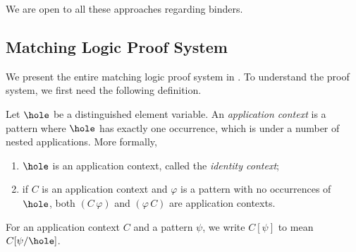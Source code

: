 \documentclass{article}
\begin{document}
We are open to all these approaches regarding binders.

\subsection{Matching Logic Proof System}
\label{sec:ml_proof_system}

We present the entire matching logic proof system in
.
To understand the proof system, we first need the following definition.

\begin{definition}
Let $\hole$ be a distinguished element variable.
An \emph{application context} is a pattern
where $\hole$ has exactly one occurrence, which is under
a number of nested applications.
More formally,
\begin{enumerate}
\item $\hole$ is an application context, called the \emph{identity context};
\item if $C$ is an application context and $\varphi$ is a pattern
      with no occurrences of $\hole$,
      both $(C \, \varphi)$ and $(\varphi \, C)$ are application contexts.
\end{enumerate}
For an application context $C$ and a pattern $\psi$,
we write $C[\psi]$ to mean $C[\psi/\hole]$.
\end{definition}
\end{document}
